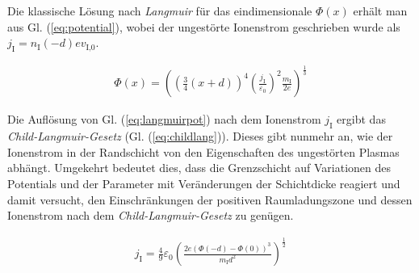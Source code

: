 \documentclass[numbers=noenddot,a4paper,notitlepage,twoside,BCOR15mm]{scrbook}
\newcommand{\ix}[1]{_\text{#1}}
\newcommand{\tilt}[1]{\textit{#1}}
\begin{document}
		Die klassische Lösung nach \tilt{Langmuir} für das eindimensionale $\Phi\left(x\right)$ erhält man aus Gl. (\ref{eq:potential}), wobei der ungestörte Ionenstrom geschrieben wurde als $j\ix{I}=n\ix{I}\left(-d\right)ev\ix{I,0}$.

			\begin{align}
				\Phi\left(x\right)=\left(\left(\frac{3}{4}\left(x+d\right)\right)^4\left(\frac{j\ix{I}}{\varepsilon\ix{0}}\right)^2\frac{m\ix{I}}{2e}\right)^{\frac{1}{3}}  \label{eq:langmuirpot}
			\end{align}

		Die Auflösung von Gl. (\ref{eq:langmuirpot}) nach dem Ionenstrom $j\ix{I}$ ergibt das \tilt{Child-Langmuir-Gesetz} (Gl. (\ref{eq:childlang})). Dieses gibt nunmehr an, wie der Ionenstrom in der Randschicht von den Eigenschaften des ungestörten Plasmas abhängt. Umgekehrt bedeutet dies, dass die Grenzschicht auf Variationen des Potentials und der Parameter mit Veränderungen der Schichtdicke reagiert und damit versucht, den Einschränkungen der positiven Raumladungszone und dessen Ionenstrom nach dem \tilt{Child-Langmuir-Gesetz} zu genügen.

			\begin{align}
				j\ix{I}=\frac{4}{9}\varepsilon\ix{0}\left(\frac{2e\left(\Phi\left(-d\right)-\Phi\left(0\right)\right)^3}{m\ix{I}d^2}\right)^{\frac{1}{2}} \label{eq:childlang}
			\end{align}
\end{document}
